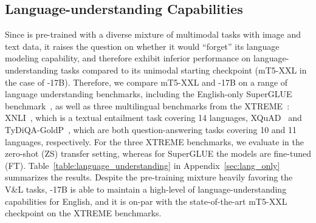 \documentclass{article}
\begin{document}
\begin{table}[ht!]
\caption{Cross-lingual VQA results on xGQA~\citep{xgqa} (left) and multilingual VQA results on MaXM~\citep{maxm} (right). All models are fine-tuned on translated VQAv2 in 13 languages. Exact-match accuracy is reported. Referenced MPT results are from \citep{maxm}}
\centering
{}
\label{table:i18n_vqa}
\end{table}

\subsection{Language-understanding Capabilities}
\label{lang_results}
Since \NAME is pre-trained with a diverse mixture of multimodal tasks with image and text data, it raises the question on whether it would ``forget'' its language modeling capability, and therefore exhibit inferior performance on language-understanding tasks compared to its unimodal starting checkpoint (mT5-XXL in the case of \NAME-17B). 
Therefore, we compare mT5-XXL and \NAME-17B on a range of language understanding benchmarks, including the English-only SuperGLUE benchmark~\citep{wang-2019-superglue}, as well as three multilingual benchmarks from the {XTREME}~\citep{pmlr-v119-hu20b}: XNLI~\citep{conneau-etal-2018-xnli}, which is a textual entailment task covering 14 languages, XQuAD~\citep{artetxe-etal-2020-cross} and TyDiQA-GoldP~\citep{clark-etal-2020-tydi}, which are both question-answering tasks covering 10 and 11 languages, respectively.
For the three {XTREME} benchmarks, we evaluate in the zero-shot (ZS) transfer setting, whereas for SuperGLUE the models are fine-tuned (FT).
Table~\ref{table:language_understanding} in Appendix~\ref{sec:lang_only} summarizes the results.
Despite the pre-training mixture heavily favoring the V\&L tasks, \NAME-17B is able to maintain a high-level of language-understanding capabilities for English, and it is on-par with the state-of-the-art mT5-XXL checkpoint on the {XTREME} benchmarks.
\end{document}
